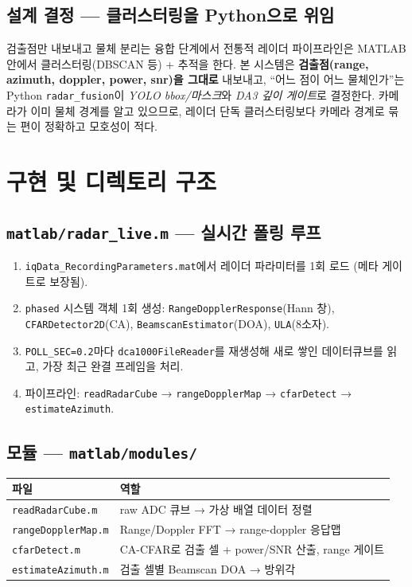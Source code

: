 \section{설계 결정 — 클러스터링을 Python으로 위임}
\begin{designbox}{검출점만 내보내고 물체 분리는 융합 단계에서}
전통적 레이더 파이프라인은 MATLAB 안에서 클러스터링(DBSCAN 등) + 추적을 한다.
본 시스템은 \textbf{검출점(range, azimuth, doppler, power, snr)을 그대로} 내보내고,
``어느 점이 어느 물체인가''는 Python \texttt{radar\_fusion}이 \emph{YOLO bbox/마스크}와
\emph{DA3 깊이 게이트}로 결정한다. 카메라가 이미 물체 경계를 알고 있으므로, 레이더
단독 클러스터링보다 카메라 경계로 묶는 편이 정확하고 모호성이 적다.
\end{designbox}

\chapter{구현 및 디렉토리 구조}

\section{\texttt{matlab/radar\_live.m} — 실시간 폴링 루프}
\begin{enumerate}
  \item \texttt{iqData\_RecordingParameters.mat}에서 레이더 파라미터를 1회 로드
        (메타 게이트로 보장됨).
  \item \texttt{phased} 시스템 객체 1회 생성: \texttt{RangeDopplerResponse}(Hann 창),
        \texttt{CFARDetector2D}(CA), \texttt{BeamscanEstimator}(DOA), \texttt{ULA}(8소자).
  \item \texttt{POLL\_SEC=0.2}마다 \texttt{dca1000FileReader}를 재생성해 새로 쌓인
        데이터큐브를 읽고, 가장 최근 완결 프레임을 처리.
  \item 파이프라인: \texttt{readRadarCube} → \texttt{rangeDopplerMap} →
        \texttt{cfarDetect} → \texttt{estimateAzimuth}.
\end{enumerate}

\section{모듈 — \texttt{matlab/modules/}}
\begin{center}
\begin{tabular}{@{}lp{8.5cm}@{}}
\toprule
파일 & 역할 \\
\midrule
\texttt{readRadarCube.m}    & raw ADC 큐브 → 가상 배열 데이터 정렬 \\
\texttt{rangeDopplerMap.m}  & Range/Doppler FFT → range-doppler 응답맵 \\
\texttt{cfarDetect.m}       & CA-CFAR로 검출 셀 + power/SNR 산출, range 게이트 \\
\texttt{estimateAzimuth.m}  & 검출 셀별 Beamscan DOA → 방위각 \\
\bottomrule
\end{tabular}
\end{center}

